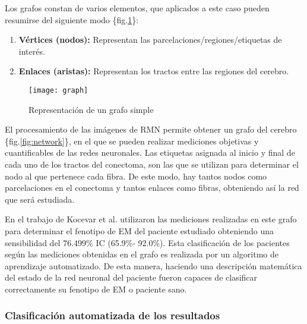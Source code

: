 \documentclass[fleqn,10pt]{UICArticle} %
\begin{document}
Los grafos constan de varios elementos, que aplicados a este caso pueden resumirse del siguiente modo  \{fig.\ref{fig:graph}\}:
\begin{enumerate}[noitemsep]
\item \textbf{Vértices (nodos):} Representan las parcelaciones/regiones/etiquetas de interés.
\item \textbf{Enlaces (aristas):} Representan los tractos entre las regiones del cerebro.
\end{enumerate}

\begin{figure}[ht]
	\centering
	\texttt{[image: graph]}
	\vspace{5mm} 
	\caption{Representación de un grafo simple}
	\label{fig:graph}
\end{figure}

El procesamiento de las imágenes de RMN permite obtener un grafo del cerebro \{fig.\ref{fig:network}\}, en el que se pueden realizar mediciones objetivas y cuantificables de las redes neuronales. Las etiquetas asignada al inicio y final de cada uno de los tractos del conectoma, son las que se utilizan para determinar el nodo al que pertenece cada fibra. De este modo, hay tantos nodos como parcelaciones en el conectoma y tantos enlaces como fibras, obteniendo así la red que será estudiada.

En el trabajo de Kocevar et al.\cite{Kocevar2016} utilizaron las mediciones realizadas en este grafo para determinar el fenotipo de EM del paciente estudiado obteniendo una sensibilidad del 76.499\% IC (65.9\%- 92.0\%). Esta clasificación de los pacientes según las mediciones obtenidas en el grafo es realizada por un algoritmo de aprendizaje automatizado. De esta manera, haciendo una descripción matemática del estado de la red neuronal del paciente fueron capaces de clasificar correctamente su fenotipo de EM o paciente sano.


\begin{figure*}[b]
	\centering
	\vspace{5mm} 
	\caption{Grafo basado en las particiones de Destrieux et al.\cite{Destrieux2010}}
	\label{fig:network}
\end{figure*}

\subsubsection{Clasificación automatizada de los resultados}
\end{document}

